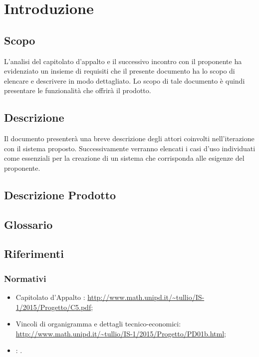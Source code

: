 \documentclass[12pt,a4paper]{article}
\begin{document}
\newpage
\tableofcontents
\newpage
\listoftables
\listoffigures
\newpage

\section{Introduzione}

\subsection{Scopo}
L’analisi del capitolato d’appalto e il successivo incontro con il proponente ha evidenziato un insieme di requisiti che il presente documento ha lo scopo di elencare e descrivere in modo dettagliato. Lo scopo di tale documento è quindi presentare le funzionalità che offrirà il prodotto.

\subsection{Descrizione}
Il documento presenterà una breve descrizione degli attori coinvolti nell'iterazione con il sistema proposto. Successivamente verranno elencati i casi d'uso individuati come essenziali per la creazione di un sistema che corrisponda alle esigenze del proponente.

\subsection{Descrizione Prodotto}
\descrizioneProdotto

\subsection{Glossario}\label{glossario}
\glossarioPrint

\subsection{Riferimenti}\label{riferimenti}
\subsubsection{Normativi}
\begin{itemize}
	\item Capitolato d’Appalto \prjL: \url{http://www.math.unipd.it/~tullio/IS-1/2015/Progetto/C5.pdf};
	\item Vincoli di organigramma e dettagli tecnico-economici: \url{http://www.math.unipd.it/~tullio/IS-1/2015/Progetto/PD01b.html};
	\item \NdP: \NdPv{} . 
\end{itemize}
\newpage
\end{document}
